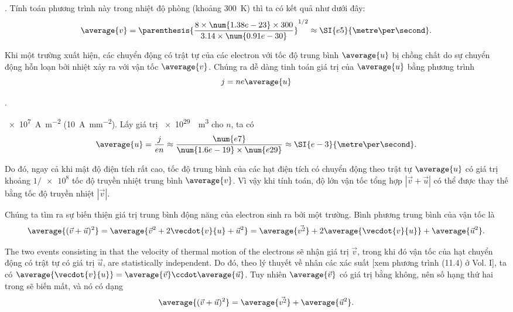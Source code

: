 .
Tính toán phương trình này trong nhiệt độ phòng (khoảng \SI{300}{\kelvin}) thì ta có kết quả như dưới đây:
\begin{equation*}
    \average{v} = \parenthesis{\frac{8 \times \num{1.38e-23} \times 300}{ 3.14 \times \num{0.91e-30} }}^{1/2} \approx \SI{e5}{\metre\per\second}.
\end{equation*}

Khi một trường xuất hiện, các chuyển động có trật tự của các electron với tốc độ trung bình  $\average{u}$ bị chồng chất do sự chuyển động hỗn loạn bởi nhiệt xảy ra với vận tốc  $\average{v}$.
Chúng ra dễ dàng tinh toán giá trị của $\average{u}$ bằng phương trình
\begin{equation}\label{eq:11_4}
    j = ne\average{u}
\end{equation}

.

 \SI{e7}{\ampere\per\metre\squared} (\SI{10}{\ampere\per\milli\metre\squared}).
Lấy giá trị \SI{e29}{\per\metre\cubed} cho $n$,  ta có
\begin{equation*}
    \average{u} = \frac{j}{en} \approx \frac{\num{e7}}{\num{1.6e-19} \times \num{e29}} \approx \SI{e-3}{\metre\per\second}.
\end{equation*}

\noindent
Do đó, ngay cả khi mật độ điện tích rất cao, tốc độ trung bình của các hạt điện tích có chuyển động theo trật tự  $\average{u}$ có giá trị khoảng $1/\num{e8}$ tốc độ truyền nhiệt trung bình $\average{v}$.
Vì vậy khi tính toán, độ lớn vận tốc tổng hợp $|\vec{v}+\vec{u}|$ có thể được thay thế bằng tốc độ truyền nhiệt $|\vec{v}|$.

Chúng ta tìm ra sự biến thiện giá trị trung bình động năng của electron sinh ra bởi một trường.
Bình phương trung bình của vận tốc là
\begin{equation}\label{eq:11_5}
    \average{(\vec{v}+\vec{u})^2} = \average{\vec{v}^2 + 2\vecdot{v}{u} + \vec{u}^2} = \average{\vec{v^2}} + 2 \average{\vecdot{v}{u}} + \average{\vec{u}^2}.
\end{equation}

\noindent
The two events consisting in that the velocity of thermal motion of the electrons sẽ nhận giá trị $\vec{v}$, trong khi đó vận tốc của hạt chuyển động có trật tự có giá trị  $\vec{u}$, are statistically independent.
Do đó, theo lý thuyết về nhân các xác suất [xem phương trình (11.4) ở Vol. I], ta có $\average{\vecdot{v}{u}} = \average{\vec{v}}\ccdot\average{\vec{u}}$.
Tuy nhiên $\average{\vec{v}}$ có giá trị bằng không, nên số hạng thứ hai trong  sẽ biến mất, và nó có dạng
\begin{equation*}
    \average{(\vec{v}+\vec{u})^2} = \average{\vec{v^2}} + \average{\vec{u}^2}.
\end{equation*}

